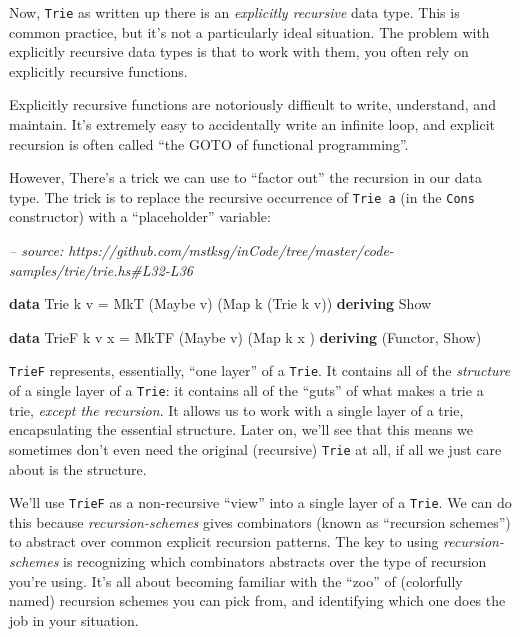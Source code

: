 \documentclass[]{article}
\newenvironment{Shaded}{}{}
\newcommand{\CommentTok}[1]{\textcolor[rgb]{0.38,0.63,0.69}{\textit{#1}}}
\newcommand{\DataTypeTok}[1]{\textcolor[rgb]{0.56,0.13,0.00}{#1}}
\newcommand{\FunctionTok}[1]{\textcolor[rgb]{0.02,0.16,0.49}{#1}}
\newcommand{\KeywordTok}[1]{\textcolor[rgb]{0.00,0.44,0.13}{\textbf{#1}}}
\newcommand{\NormalTok}[1]{#1}
\begin{document}
Now, \texttt{Trie} as written up there is an \emph{explicitly recursive} data
type. This is common practice, but it's not a particularly ideal situation. The
problem with explicitly recursive data types is that to work with them, you
often rely on explicitly recursive functions.

Explicitly recursive functions are notoriously difficult to write, understand,
and maintain. It's extremely easy to accidentally write an infinite loop, and
explicit recursion is often called ``the GOTO of functional programming''.

However, There's a trick we can use to ``factor out'' the recursion in our data
type. The trick is to replace the recursive occurrence of \texttt{Trie\ a} (in
the \texttt{Cons} constructor) with a ``placeholder'' variable:

\begin{Shaded}
\begin{Highlighting}[]
\CommentTok{-- source: https://github.com/mstksg/inCode/tree/master/code-samples/trie/trie.hs#L32-L36}

\KeywordTok{data} \DataTypeTok{Trie}\NormalTok{  k v   }\FunctionTok{=} \DataTypeTok{MkT}\NormalTok{  (}\DataTypeTok{Maybe}\NormalTok{ v) (}\DataTypeTok{Map}\NormalTok{ k (}\DataTypeTok{Trie}\NormalTok{ k v))}
  \KeywordTok{deriving} \DataTypeTok{Show}

\KeywordTok{data} \DataTypeTok{TrieF}\NormalTok{ k v x }\FunctionTok{=} \DataTypeTok{MkTF}\NormalTok{ (}\DataTypeTok{Maybe}\NormalTok{ v) (}\DataTypeTok{Map}\NormalTok{ k x         )}
  \KeywordTok{deriving}\NormalTok{ (}\DataTypeTok{Functor}\NormalTok{, }\DataTypeTok{Show}\NormalTok{)}
\end{Highlighting}
\end{Shaded}

\texttt{TrieF} represents, essentially, ``one layer'' of a \texttt{Trie}. It
contains all of the \emph{structure} of a single layer of a \texttt{Trie}: it
contains all of the ``guts'' of what makes a trie a trie, \emph{except the
recursion}. It allows us to work with a single layer of a trie, encapsulating
the essential structure. Later on, we'll see that this means we sometimes don't
even need the original (recursive) \texttt{Trie} at all, if all we just care
about is the structure.

We'll use \texttt{TrieF} as a non-recursive ``view'' into a single layer of a
\texttt{Trie}. We can do this because \emph{recursion-schemes} gives combinators
(known as ``recursion schemes'') to abstract over common explicit recursion
patterns. The key to using \emph{recursion-schemes} is recognizing which
combinators abstracts over the type of recursion you're using. It's all about
becoming familiar with the ``zoo'' of (colorfully named) recursion schemes you
can pick from, and identifying which one does the job in your situation.
\end{document}
